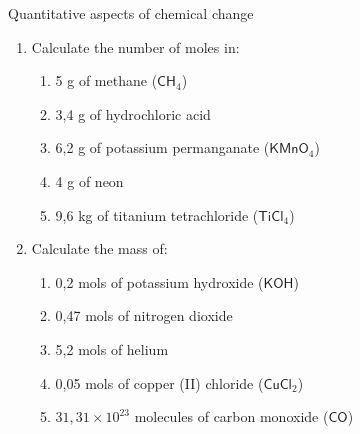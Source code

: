 \begin{eocexercises}{Quantitative aspects of chemical change}
\begin{enumerate}[noitemsep, label=\textbf{\arabic*}. ]
\begin{enumerate}[noitemsep, label=\textbf{\alph*}. ]
\begin{enumerate}[noitemsep, label=\textbf{\alph*}. ]
\end{enumerate}
                \label{m38712*uid137}\item In the compound potassium sulphate ($\mathsf{K}{}_{2}\mathsf{SO}{}_{4}$), oxygen makes up x\% of the mass of the compound. x = ...
\label{m38712*id286432}\begin{enumerate}[noitemsep, label=\textbf{\alph*}. ] 
            \label{m38712*uid138}\item 36.8
\label{m38712*uid139}\item 9,2
\label{m38712*uid140}\item 4
\label{m38712*uid141}\item 18,3
\end{enumerate}
                \label{m38712*uid142}\item The molarity of a $150\phantom{\rule{2pt}{0ex}}{\mathsf{cm}}^{3}$ solution, containing 5 g of $\mathsf{NaCl}$ is...
\label{m38712*id286512}\begin{enumerate}[noitemsep, label=\textbf{\alph*}. ] 
            \label{m38712*uid143}\item $0,09\phantom{\rule{2pt}{0ex}}\mathsf{M}$
\label{m38712*uid144}\item $5,7\phantom{\rule{2pt}{0ex}}\ensuremath{\times}10{}^{-4}\phantom{\rule{2pt}{0ex}}\mathsf{M}$
\label{m38712*uid145}\item $0,57\phantom{\rule{2pt}{0ex}}\mathsf{M}$
\label{m38712*uid146}\item $0,03\phantom{\rule{2pt}{0ex}}\mathsf{M}$
\end{enumerate}
                \end{enumerate}
        \item Calculate the number of moles in:
\label{m38712*id6342}\begin{enumerate}[noitemsep, label=\textbf{\alph*}. ] 
            \item 5 g of methane (${\mathsf{CH}}_{4}$)\item 3,4 g of hydrochloric acid\item 6,2 g of potassium permanganate (${\mathsf{KMnO}}_{4}$)\item 4 g of neon\item 9,6 kg of titanium tetrachloride (${\mathsf{TiCl}}_{4}$)\end{enumerate}
        \item Calculate the mass of:\label{m38712*id7342}\begin{enumerate}[noitemsep, label=\textbf{\alph*}. ] 
            \item 0,2 mols of potassium hydroxide ($\mathsf{KOH}$)\item 0,47 mols of nitrogen dioxide\item 5,2 mols of helium\item 0,05 mols of copper (II) chloride (${\mathsf{CuCl}}_{2}$)\item $31,31\ensuremath{\times}{10}^{23}$ molecules of carbon monoxide ($\mathsf{CO}$)\end{enumerate}

\end{enumerate}
\end{eocexercises}
